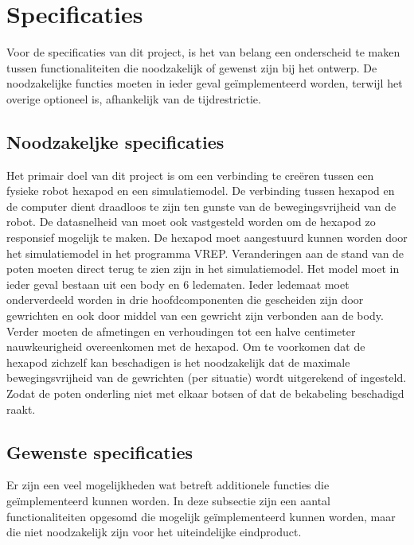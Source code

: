 \documentclass[10pt,a4paper]{article}
\begin{document}
\newpage
\section{Specificaties}

Voor de specificaties van dit project, is het van belang een onderscheid te maken tussen functionaliteiten die noodzakelijk of gewenst zijn bij het ontwerp. De noodzakelijke functies moeten in ieder geval ge\"implementeerd worden, terwijl het overige optioneel is, afhankelijk van de tijdrestrictie.

\subsection{Noodzakeljke specificaties}
Het primair doel van dit project is om een verbinding te cre\"eren tussen een fysieke robot hexapod en een simulatiemodel. De verbinding tussen hexapod en de computer dient draadloos te zijn ten gunste van de bewegingsvrijheid van de robot. De datasnelheid van moet ook vastgesteld worden om de hexapod zo responsief mogelijk te maken. De hexapod moet aangestuurd kunnen worden door het simulatiemodel in het programma VREP. Veranderingen aan de stand van de poten moeten direct terug te zien zijn in het simulatiemodel. Het model moet in ieder geval bestaan uit een body en 6 ledematen. Ieder ledemaat moet onderverdeeld worden in drie hoofdcomponenten die gescheiden zijn door gewrichten en ook door middel van een gewricht zijn verbonden aan de body. Verder moeten de afmetingen en verhoudingen tot een halve centimeter nauwkeurigheid overeenkomen met de hexapod.
Om te voorkomen dat de hexapod zichzelf kan beschadigen is het noodzakelijk dat de maximale bewegingsvrijheid van de gewrichten (per situatie) wordt uitgerekend of ingesteld. Zodat de poten onderling niet met elkaar botsen of dat de bekabeling beschadigd raakt.

\subsection{Gewenste specificaties}
Er zijn een veel mogelijkheden wat betreft additionele functies die ge\"implementeerd kunnen worden. In deze subsectie zijn een aantal functionaliteiten opgesomd die mogelijk ge\"implementeerd kunnen worden, maar die niet noodzakelijk zijn voor het uiteindelijke eindproduct.
\end{document}
